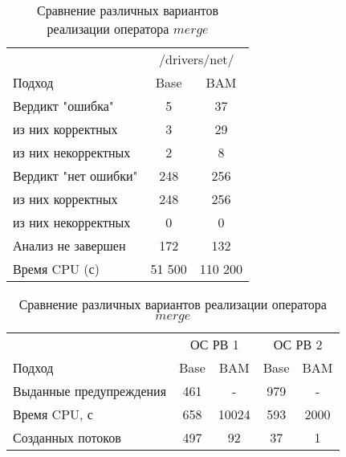 \begin{center}
  \begin{table}[h]\footnotesize \centering
  	\label{table-drivers-lock-refinement}
    \caption{Сравнение различных вариантов реализации оператора $merge$}
    \begin{tabular}{ | l | c | c | }
      \hline
      		& 		 \multicolumn{2}{|c|}{/drivers/net/} \\
      Подход         				& Base  	& BAM 	\\ \hline
      Вердикт "ошибка" 				& 5   		& 37    \\ 
  \hspace{0.5cm} из них корректных 	& 3 		& 29 	\\ 
  \hspace{0.5cm} из них некорректных & 2		& 8 	\\ \hline
      Вердикт "нет ошибки"  		& 248    	& 256    \\ 
  \hspace{0.5cm} из них корректных 	& 248 		& 256    \\
  \hspace{0.5cm} из них некорректных & 0 		& 0    	\\ \hline
      Анализ не завершен       		& 172    	& 132    \\ \hline
      Время CPU (с)   				& 51 500 	& 110 200 \\ 
      \hline
    \end{tabular}
  \end{table}
\end{center}


\begin{center}
  \begin{table}[h]\footnotesize \centering
  	\label{table-drivers-lock-refinement}
    \caption{Сравнение различных вариантов реализации оператора $merge$}
    \begin{tabular}{ | l | c | c | c | c |  }
      \hline
      		& 			 \multicolumn{2}{|c|}{ОС РВ 1} & 	\multicolumn{2}{|c|}{ОС РВ 2}\\
      Подход         					& Base  & BAM  		& Base  & BAM 	\\ \hline
      Выданные предупреждения			& 461   & - 	   	& 979   & -  			\\ 
  	  Время CPU, с 						& 658   & 10024		& 593   & 2000  		\\ 
      Созданных потоков					& 497   & 92    	& 37   	& 1  			\\ \hline
      \hline
    \end{tabular}
  \end{table}
\end{center}

